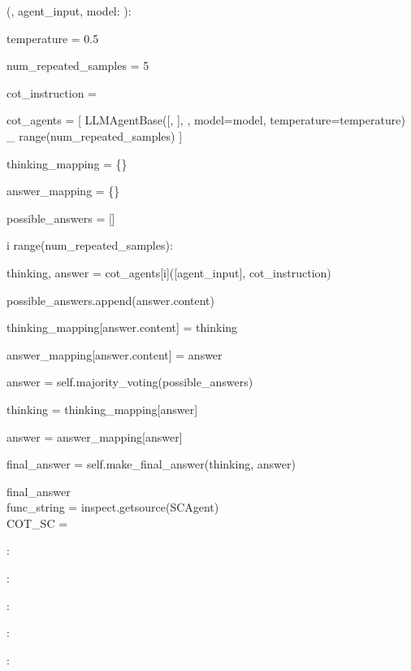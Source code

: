 \begin{subagent}[title={SCAgent}]
      (, agent\_input, model: ):

\quad {}

\quad temperature = 0.5

\quad num\_repeated\_samples = 5

\quad {}

\quad cot\_instruction = 

\quad {}

\quad cot\_agents = [
\quad\quad LLMAgentBase([, ],
\quad\quad {},
\quad\quad model=model,
\quad\quad temperature=temperature)
\quad\quad {} \_  range(num\_repeated\_samples)
\quad ]

\quad thinking\_mapping = \{\}

\quad answer\_mapping = \{\}

\quad possible\_answers = []

\quad {} i  range(num\_repeated\_samples):

\quad\quad thinking, answer =  cot\_agents[i]([agent\_input], cot\_instruction)

\quad\quad possible\_answers.append(answer.content)

\quad\quad thinking\_mapping[answer.content] = thinking

\quad\quad answer\_mapping[answer.content] = answer

\quad {}

\quad answer = self.majority\_voting(possible\_answers)

\quad thinking = thinking\_mapping[answer]

\quad answer = answer\_mapping[answer]

\quad final\_answer = self.make\_final\_answer(thinking, answer)

\quad {} final\_answer \\

func\_string = inspect.getsource(SCAgent) \\

COT\_SC = \code{\{}

\quad {}:

\quad {}:

\quad {}: \code{\{}

\quad\quad {}:

\quad \code{\}}

\quad {}:

\code{\}}

\end{subagent}


